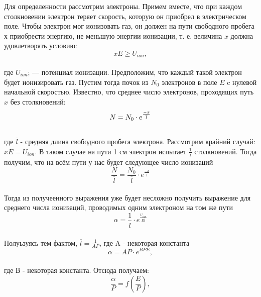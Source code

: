 \documentclass[a4paper, 12pt]{article}
\begin{document}
Для определенности рассмотрим электроны. Примем вместе, что при каждом столкновении
электрон теряет скорость, которую он приобрел в электрическом поле.
Чтобы электрон мог ионизовать газ, он должен на пути свободного пробега х приобрести
энергию, не меньшую энергии ионизации, т. е. величина $x$
должна удовлетворять условию:\\
\begin{equation*}
    xE \geq U_{ion},
\end{equation*}
\\
где $U_{ion}$; — потенциал ионизации. Предположим, что каждый такой электрон будет ионизировать газ.
Пустим тогда почок из $N_0$ электронов в поле $E$ c нулевой начальной скоростью. Известно, что
среднее число электронов, проходящих путь $x$ без столкновений:
\begin{equation*}\\
    N = N_0\cdot e^{\frac{-x}{\overline l}}
\end{equation*}
\\
где $\overline l$ - средняя длина свободного пробега электрона. Рассмотрим крайний случай:
$ xE = U_{ion}$. В таком случае на пути 1 см электрон испытает $\frac{1}{\overline l}$
столкновений. Тогда получим, что на всём пути у нас будет следующее число ионизаций\\
\begin{equation}
    \frac{N}{\overline l} = \frac{N_0}{\overline l}\cdot e^{\frac{-x}{\overline l}}
\end{equation}
\\
Тогда из получеенного выражения уже будет несложно получить выражение для среднего числа
ионизаций, проводимых одним электроном на том же пути\\
\begin{equation}
    \alpha = \frac{1}{\overline l}\cdot e^{\frac{U_{ion}}{E \overline l}}
\end{equation}
\\
Полуьзуясь тем фактом, $\overline l = \frac{1}{AP}$, где A - некоторая константа
\\
\begin{equation}
    \alpha = AP \cdot e^{{BP}{E}},
\end{equation}
\\
где В - некоторая константа. Отсюда получаем:\\
\begin{equation}
    \frac{\alpha}{P} = f(\frac{E}{P}),
\end{equation}
\\
\end{document}
